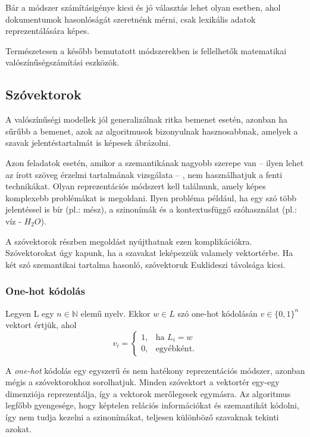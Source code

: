 Bár a módszer számításigénye kicsi és jó választás lehet olyan esetben, ahol dokumentumok hasonlóságát szeretnénk mérni, csak lexikális adatok reprezentálására képes. 

\begin{note}
	Természetesen a később bemutatott módszerekben is fellelhetők matematikai valószínűségszámítási eszközök.
\end{note}

\subsection{Szóvektorok}

A valószínűségi modellek jól generalizálnak ritka bemenet esetén, azonban ha sűrűbb a bemenet, azok az algoritmusok bizonyulnak hasznosabbnak, amelyek a szavak jelentéstartalmát is képesek ábrázolni.

Azon feladatok esetén, amikor a szemantikának nagyobb szerepe van – ilyen lehet az írott szöveg érzelmi tartalmának vizsgálata – , nem használhatjuk a fenti technikákat. Olyan reprezentációs módszert kell találnunk, amely képes komplexebb problémákat is megoldani. Ilyen probléma például, ha egy szó több jelentéssel is bír (pl.: mész), a szinonímák és a kontextusfüggő szóhasználat (pl.: víz - $H_2O$).

A szóvektorok részben megoldást nyújthatnak ezen komplikációkra. Szóvektorokat úgy kapunk, ha a szavakat leképezzük valamely vektortérbe. Ha két szó szemantikai tartalma hasonló, szóvektoruk Euklideszi távolsága kicsi.

\subsubsection{One-hot kódolás}

\begin{definition}
Legyen L egy $n \in \mathbb{N}$ elemű nyelv. Ekkor $w \in L$ szó one-hot kódolásán $v \in \{0,1\}^n$ vektort értjük, ahol 
\[
v_i= 
\begin{cases}
1,				& \text{ha } L_i = w\\
0,              & \text{egyébként.}
\end{cases}
\]
\end{definition}

A \textit{one-hot} kódolás egy egyszerű és nem hatékony reprezentációs módszer, azonban mégis a szóvektorokhoz sorolhatjuk. Minden szóvektort a vektortér egy-egy dimenziója reprezentálja, így a vektorok merőlegesek egymásra. Az algoritmus legfőbb gyengesége, hogy képtelen relációs információkat és szemantikát  kódolni, így nem tudja kezelni a szinonímákat, teljesen különböző szavaknak tekinti azokat.

